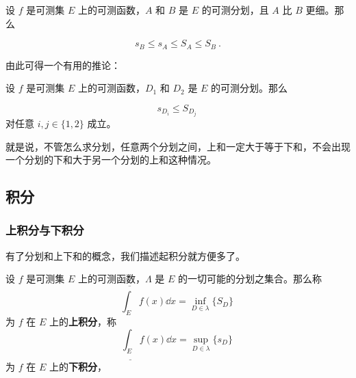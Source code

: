 \begin{lemma}{}\label{lem_Lebes1_1}

设 $f$ 是可测集 $E$ 上的可测函数，$A$ 和 $B$ 是 $E$ 的可测分划，且 $A$ 比 $B$ 更细。那么

\begin{equation}
s_B\leq s_A\leq S_A\leq S_B~.
\end{equation}


\end{lemma}

由此可得一个有用的推论：

\begin{corollary}{}\label{cor_Lebes1_1}
设 $f$ 是可测集 $E$ 上的可测函数，$D_1$ 和 $D_2$ 是 $E$ 的可测分划。那么

\begin{equation}
s_{D_i}\leq S_{D_j}~
\end{equation}
对任意 $i, j\in\{1, 2\}$ 成立。

\end{corollary}

就是说，不管怎么求分划，任意两个分划之间，上和一定大于等于下和，不会出现一个分划的下和大于另一个分划的上和这种情况。






\subsection{积分}

\subsubsection{上积分与下积分}

有了分划和上下和的概念，我们描述起积分就方便多了。

\begin{definition}{}

设 $f$ 是可测集 $E$ 上的可测函数，$\Lambda$ 是 $E$ 的一切可能的分划之集合。那么称
\begin{equation}
\overline{\int_E} f(x) \dd x=\inf_{D\in \lambda} \{S_D\}~
\end{equation}
为 $f$ 在 $E$ 上的\textbf{上积分}，称
\begin{equation}
\underline{\int_E} f(x) \dd x=\sup_{D\in \lambda} \{s_D\}~
\end{equation}
为 $f$ 在 $E$ 上的\textbf{下积分}，



\end{definition}

